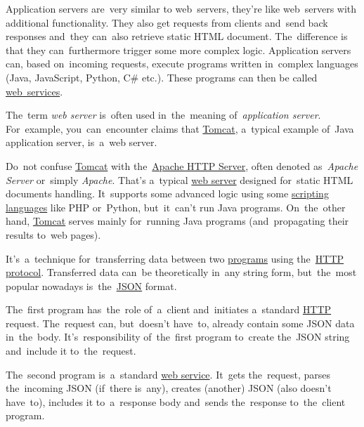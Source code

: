 \label{applicationserver}
Application servers are~very similar to web~servers, they're like web~servers with additional functionality.
They also get requests from clients and~send back responses and~they can~also retrieve static HTML document.
The~difference is that they can~furthermore trigger some more complex logic.
Application servers can, based on~incoming requests, execute programs written in~complex languages (Java, JavaScript, Python, C\# etc.).
These programs can then be called \hyperref[webserviceapplication]{web~services}.

\warning The~term \textit{web server} is~often used in~the~meaning of~\textit{application server}.
For~example, you~can~encounter claims that \hyperref[tomcat]{Tomcat}, a~typical example of~Java application server, is~a~web server.

\warning Do~not confuse \hyperref[tomcat]{Tomcat} with the~\href{https://en.wikipedia.org/wiki/Apache_HTTP_Server}{Apache HTTP Server}, often denoted as~\textit{Apache Server} or~simply \textit{Apache}.
That's a~typical \hyperref[webserver]{web server} designed for~static HTML documents handling.
It~supports some advanced logic using some \hyperref[scriptinglanguages]{scripting languages} like PHP or~Python, but~it~can't run Java programs.
On~the~other hand, \hyperref[tomcat]{Tomcat} serves mainly for~running Java programs (and~propagating their results to~web pages).

\label{dns}

\label{rest}
It's~a~technique for~transferring data between two \hyperref[applicationprocessprogramservicethread]{programs} using the~\hyperref[http]{HTTP protocol}.
Transferred data can~be theoretically in~any string form, but~the~most popular nowadays is~the~\hyperref[json]{JSON} format.

The~first program has~the~role of~a~client and~initiates a~standard \hyperref[http]{HTTP} request.
The~request can, but~doesn't have~to, already contain some JSON data in~the~body.
It's~responsibility of~the~first program to~create the~JSON string and~include it to~the~request.

The~second program is~a~standard \hyperref[webserviceapplication]{web service}.
It~gets the~request, parses the~incoming JSON (if~there is~any), creates (another) JSON (also doesn't have~to), includes it to~a~response body and~sends the~response to~the~client program.

